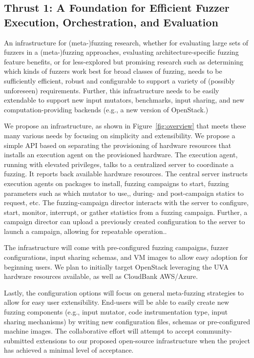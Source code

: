 \subsection{Thrust 1: A Foundation for Efficient Fuzzer Execution,
Orchestration, and Evaluation}

An infrastructure for (meta-)fuzzing research, 
whether for evaluating large sets of fuzzers in a (meta-)fuzzing approaches, 
evaluating architecture-specific fuzzing feature benefits, 
or for less-explored but promising research such as determining which kinds of 
fuzzers work best for broad classes of fuzzing, needs to be sufficiently 
efficient, robust and configurable to support a variety of (possibly 
unforeseen) requirements.  
Further, this infrastructure needs to be easily extendable to support new input 
mutators, benchmarks, input sharing, and new computation-providing backends 
(e.g., a new version of OpenStack.)

We propose an infrastructure, as shown in Figure~\ref{fig:overview} that meets these many various needs by focusing on 
simplicity and extensibility.  We propose a simple API based on separating the 
provisioning of hardware resources that installs an execution agent on the 
provisioned hardware.   The execution agent, running with elevated privileges, 
talks to a centralized server to coordinate a fuzzing.  It reports back 
available hardware resources.  The central server instructs execution agents on 
packages to install, fuzzing campaigns to start, fuzzing parameters such as 
which mutator to use,, during- and post-campaign statics to request, etc.  The 
fuzzing-campaign director interacts with the server to configure, start, 
monitor, interrupt, or gather statistics from a fuzzing campaign.  Further, a 
campaign director can upload a previously created configuration to the server 
to launch a campaign, allowing for repeatable operation..  

The infrastructure will come with pre-configured fuzzing campaigns, fuzzer 
configurations, input sharing schemas, and VM images to allow easy adoption for 
beginning users.  We plan to initially target OpenStack leveraging the UVA 
hardware resources available, as well as CloudBank AWS/Azure.

Lastly, the configuration options will focus on general meta-fuzzing strategies 
to allow for easy user extensibility.  End-users will be able to easily create 
new fuzzing components (e.g., input mutator, code instrumentation type, input 
sharing mechanisms) by writing new configuration files, schemas or 
pre-configured machine images.  The collaborative effort will attempt to accept 
community-submitted extensions to our proposed open-source infrastructure when 
the project has achieved a minimal level of acceptance.

